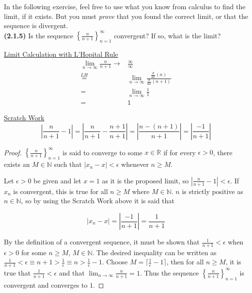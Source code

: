 \documentclass[12pt]{article}
\newcommand{\set}[1]{\left\{ {#1} \right\}}
\newcommand{\limtoinf}[1]{\lim_{ {#1} \to\infty}}
\newcommand{\abs}[1]{\left| {#1} \right|}
\newcommand{\ceil}[1]{\lceil {#1} \rceil}
\newcommand{\bR}{\mathbb{R}}
\newcommand{\bN}{\mathbb{N}}
\begin{document}
\pagestyle{fancy}
\setlength{\headheight}{14.49998pt}
\fancyfoot[C]{\thepage}

\noindent In the following exercise, feel free to use what you know from calculus to find the limit, if it exists. But you must \textit{prove} that you found the correct limit, or that the sequence is divergent. \\

\noindent \textbf{(2.1.5)} Is the sequence $\set{\frac{n}{n+1}}_{n=1}^\infty$ convergent? If so, what is the limit?

\noindent \underline{Limit Calculation with L'Hopital Rule}
\begin{align*}
	\limtoinf{n} \frac{n}{n+1} \to & \frac{\infty}{\infty} \\
	\overset{LH}{=}& \limtoinf{n} \frac{\frac{d}{dn}(n)}{\frac{d}{dn}(n+1)} \\
	=& \limtoinf{n} \frac{1}{1} \\
	=& 1
\end{align*}

\noindent \underline{Scratch Work}
\begin{equation*}
	\abs{\frac{n}{n+1}-1}=\abs{\frac{n}{n+1}-\frac{n+1}{n+1}}=\abs{\frac{n-(n+1)}{n+1}}=\abs{\frac{-1}{n+1}}
\end{equation*}

\begin{proof}
	$\set{\frac{n}{n+1}}_{n=1}^\infty$ is said to converge to some $x\in\bR$ if for every $\epsilon>0$, there exists an $M\in\bN$ such that $\abs{x_n-x}<\epsilon$ whenever $n\ge M$.
	
\indent Let $\epsilon > 0$ be given and let $x=1$ as it is the proposed limit, so $\abs{\frac{n}{n+1}-1}<\epsilon$. If $x_n$ is convergent, this is true for all $n\ge M$ where $M\in\bN$. $n$ is strictly positive as $n\in\bN$, so by using the Scratch Work above it is said that

\begin{equation*}
	\abs{x_n-x}=\abs{\frac{-1}{n+1}}=\frac{1}{n+1}
\end{equation*}

\noindent By the definition of a convergent sequence, it must be shown that $\frac{1}{n+1}<\epsilon$ when $\epsilon >0$ for some $n\ge M$, $M\in\bN$. The desired inequality can be written as $\frac{1}{n+1}<\epsilon\equiv n+1>\frac{1}{\epsilon}\equiv n>\frac{1}{\epsilon}-1$. Choose $M=\ceil{\frac{1}{\epsilon}-1}$, then for all $n\ge M$, it is true that $\frac{1}{n+1}<\epsilon$ and that $\limtoinf{n} \frac{n}{n+1}=1$. Thus the sequence $\set{\frac{n}{n+1}}_{n=1}^\infty$ is convergent and converges to $1$. 
\end{proof}
\end{document}
